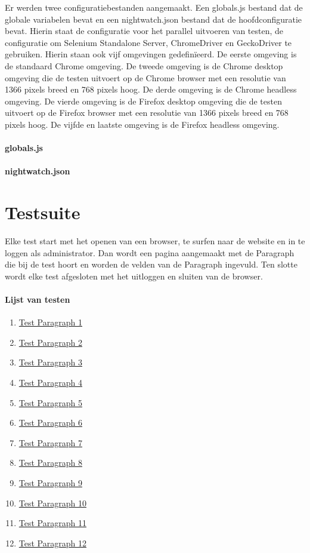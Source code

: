 Er werden twee configuratiebestanden aangemaakt. Een globals.js bestand dat de globale variabelen bevat en een nightwatch.json bestand dat de hoofdconfiguratie bevat. Hierin staat de configuratie voor het parallel uitvoeren van testen, de configuratie om Selenium Standalone Server, ChromeDriver en GeckoDriver te gebruiken. Hierin staan ook vijf omgevingen gedefinïeerd. De eerste omgeving is de standaard Chrome omgeving. De tweede omgeving is de Chrome desktop omgeving die de testen uitvoert op de Chrome browser met een resolutie van 1366 pixels breed en 768 pixels hoog. De derde omgeving is de Chrome \gls{headless} omgeving. De vierde omgeving is de Firefox desktop omgeving die de testen uitvoert op de Firefox browser met een resolutie van 1366 pixels breed en 768 pixels hoog. De vijfde en laatste omgeving is de Firefox \gls{headless} omgeving.

\paragraph{globals.js}

\clearpage
\paragraph{nightwatch.json}


\clearpage
\section{Testsuite}
Elke test start met het openen van een browser, te surfen naar de website en in te loggen als administrator. Dan wordt een pagina aangemaakt met de Paragraph die bij de test hoort en worden de velden van de Paragraph ingevuld. Ten slotte wordt elke test afgesloten met het uitloggen en sluiten van de browser.

\paragraph{Lijst van testen}
\begin{enumerate}
\item \hyperref[test1]{Test Paragraph 1}
\item \hyperref[test2]{Test Paragraph 2}
\item \hyperref[test3]{Test Paragraph 3}
\item \hyperref[test4]{Test Paragraph 4}
\item \hyperref[test5]{Test Paragraph 5}
\item \hyperref[test6]{Test Paragraph 6}
\item \hyperref[test7]{Test Paragraph 7}
\item \hyperref[test8]{Test Paragraph 8}
\item \hyperref[test9]{Test Paragraph 9}
\item \hyperref[test10]{Test Paragraph 10}
\item \hyperref[test11]{Test Paragraph 11}
\item \hyperref[test12]{Test Paragraph 12}
\end{enumerate}


